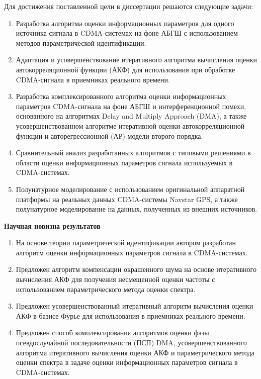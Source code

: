 Для достижения поставленной цели в диссертации решаются следующие задачи:
\begin{enumerate}
	\item {Разработка алгоритма оценки информационных параметров для одного источника сигнала в CDMA-системах на фоне АБГШ с использованием методов параметрической идентификации.}
	\item {Адаптация и усовершенствование итеративного алгоритма вычисления оценки автокорреляционной функции (АКФ) для использования при обработке CDMA-сигнала в
		приемниках реального времени.}
	\item {Разработка комплексированного алгоритма оценки информационных параметров CDMA-сигнала на фоне АБГШ и интерференционной помехи, основанного на алгоритмах
		Delay and Multiply Approach (DMA), а также усовершенствованном алгоритме итеративной оценки автокорреляционной функции и авторегрессионной (АР) модели второго порядка.}
	\item {Сравнительный анализ разработанных алгоритмов с типовыми решениями в области оценки информационных параметров сигнала используемых в CDMA-системах.}
	\item {Полунатурное моделирование с использованием оригинальной аппаратной платформы на реальных данных CDMA-системы Navstar GPS, а также полунатурное
		моделирование на данных, полученных из внешних источников.}
\end{enumerate}

{\bf{Научная новизна результатов}}
\begin{enumerate}
	\item {На основе теории параметрической идентификации автором разработан алгоритм оценки информационных параметров сигнала в CDMA-системах.}
	\item {Предложен алгоритм компенсации окрашенного шума на основе итеративного вычисления АКФ для получения несмещенной оценки частоты с использованием
		параметрического метода оценки спектра.}
	\item {Предложен усовершенствованный итеративный алгоритм вычисления оценки АКФ в базисе Фурье для использования в приемниках реального времени.}
	\item {Предложен способ комплексирования алгоритмов оценки фазы псевдослучайной последовательности (ПСП) DMA, усовершенствованного алгоритма итеративного
		вычисления оценки АКФ и параметрического метода оценки спектра в задаче оценки информационных параметров сигнала в CDMA-системах.}
\end{enumerate}

